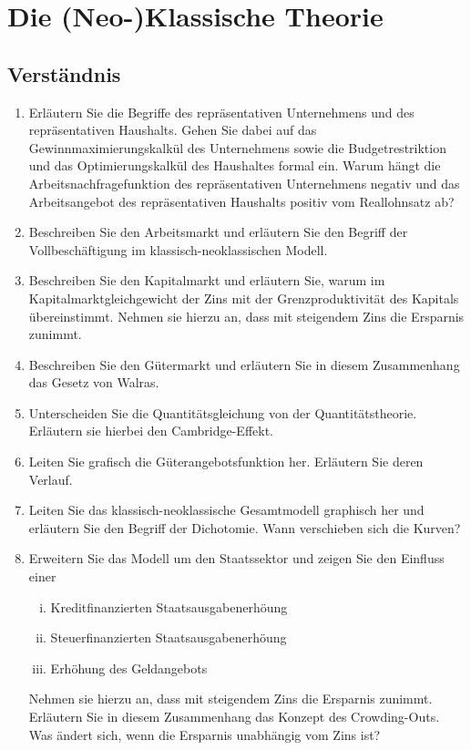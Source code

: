 \documentclass{scrartcl}
\begin{document}
\section{Die (Neo-)Klassische Theorie}

\subsection{Verständnis}
\begin{enumerate}
	\item Erläutern Sie die Begriffe des repräsentativen Unternehmens und des repräsentativen Haushalts. Gehen Sie dabei auf das Gewinnmaximierungskalkül des Unternehmens sowie die Budgetrestriktion und das Optimierungskalkül des Haushaltes formal ein. Warum hängt die Arbeitsnachfragefunktion des repräsentativen Unternehmens negativ und das Arbeitsangebot des repräsentativen Haushalts positiv vom Reallohnsatz ab?
	\item Beschreiben Sie den Arbeitsmarkt und erläutern Sie den Begriff der Vollbeschäftigung im klassisch-neoklassischen Modell.
	\item Beschreiben Sie den Kapitalmarkt und erläutern Sie, warum im Kapitalmarktgleichgewicht der Zins mit der Grenzproduktivität des Kapitals übereinstimmt. Nehmen sie hierzu an, dass mit steigendem Zins die Ersparnis zunimmt.
	\item Beschreiben Sie den Gütermarkt und erläutern Sie in diesem Zusammenhang das Gesetz von Walras.
	\item Unterscheiden Sie die Quantitätsgleichung von der Quantitätstheorie. Erläutern sie hierbei den Cambridge-Effekt.
	\item Leiten Sie grafisch die Güterangebotsfunktion her. Erläutern Sie deren Verlauf.
	\item Leiten Sie das klassisch-neoklassische Gesamtmodell graphisch her und erläutern Sie den Begriff der Dichotomie. Wann verschieben sich die Kurven?
	\item Erweitern Sie das Modell um den Staatssektor und zeigen Sie den Einfluss einer
	\begin{enumerate}[(i)]
		\item Kreditfinanzierten Staatsausgabenerhöung
		\item Steuerfinanzierten Staatsausgabenerhöung
		\item Erhöhung des Geldangebots
	\end{enumerate}
	Nehmen sie hierzu an, dass mit steigendem Zins die Ersparnis zunimmt. Erläutern Sie in diesem Zusammenhang das Konzept des Crowding-Outs. Was ändert sich, wenn die Ersparnis unabhängig vom Zins ist?
\end{enumerate}
\end{document}
